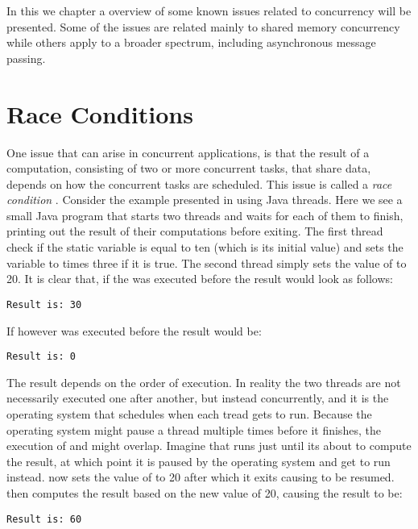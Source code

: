 \makeatletter {}\makeatother
{}
In this we chapter a overview of some known issues related to concurrency will be presented. Some of the issues are related mainly to shared memory concurrency while others apply to a broader spectrum, including asynchronous message passing.
\section{Race Conditions}
One issue that can arise in concurrent applications, is that the result of a computation, consisting of two or more concurrent tasks, that share data, depends on how the concurrent tasks are scheduled. This issue is called a \emph{race condition}
\cite[p. 983]{bryant2011computer}\cite[p. 115]{tanenbaum2008modern}. Consider the example presented in  using Java threads. Here we see a small Java program that starts two threads and waits for each of them to finish, printing out the result of their computations before exiting. The first thread check if the static variable  is equal to ten (which is its initial value) and sets the  variable to  times three if it is true. The second thread simply sets the value of  to 20. It is clear that, if the  was executed before  the result would look as follows:
\begin{verbatim}
Result is: 30
\end{verbatim}
If however  was executed before  the result would be:
\begin{verbatim}
Result is: 0
\end{verbatim}
The result depends on the order of execution. In reality the two threads are not necessarily executed one after another, but instead concurrently, and it is the operating system that schedules when each tread gets to run. Because the operating system might pause a thread multiple times before it finishes, the execution of  and  might overlap. Imagine that  runs just until its about to compute the result, at which point it is paused by the operating system and  get to run instead.  now sets the value of  to 20 after which it exits causing  to be resumed.  then computes the result based on the new  value of 20, causing the result to be:
\begin{verbatim}
Result is: 60
\end{verbatim}
